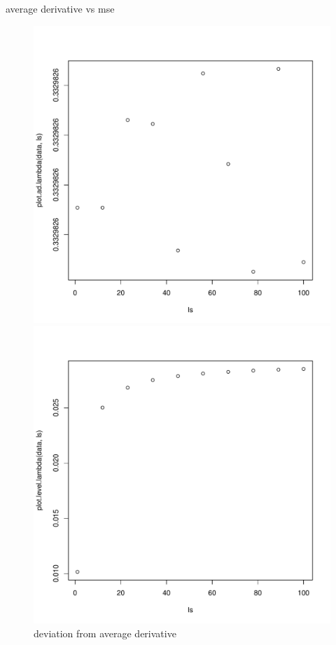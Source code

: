 \documentclass[10pt,xcolor=table]{beamer}
\begin{document}
\begin{frame}{average derivative vs mse}
	\begin{figure}[ht]
        \begin{minipage}[t]{0.45\linewidth}
            \centering
            \includegraphics[width = \textwidth, keepaspectratio]{ad_lambdas.pdf}
                       \caption{deviation from average derivative}
            \label{fig:a}
        \end{minipage}
        \hspace{0.5cm}
        \begin{minipage}[t]{0.45\linewidth}
            \centering
            \includegraphics[width = \textwidth, keepaspectratio]{mse_lambdas.pdf}

\end{minipage}
\end{figure}
\end{frame}
\end{document}
